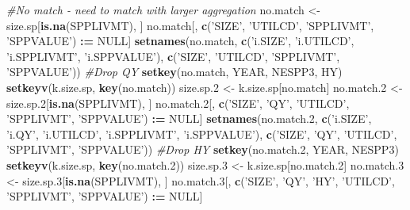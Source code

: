 \documentclass[]{article}
\newenvironment{Shaded}{\begin{snugshade}}{\end{snugshade}}
\newcommand{\KeywordTok}[1]{\textcolor[rgb]{0.13,0.29,0.53}{\textbf{#1}}}
\newcommand{\DecValTok}[1]{\textcolor[rgb]{0.00,0.00,0.81}{#1}}
\newcommand{\StringTok}[1]{\textcolor[rgb]{0.31,0.60,0.02}{#1}}
\newcommand{\CommentTok}[1]{\textcolor[rgb]{0.56,0.35,0.01}{\textit{#1}}}
\newcommand{\OtherTok}[1]{\textcolor[rgb]{0.56,0.35,0.01}{#1}}
\newcommand{\OperatorTok}[1]{\textcolor[rgb]{0.81,0.36,0.00}{\textbf{#1}}}
\newcommand{\ErrorTok}[1]{\textcolor[rgb]{0.64,0.00,0.00}{\textbf{#1}}}
\newcommand{\NormalTok}[1]{#1}
\begin{document}
\begin{Shaded}
\begin{Highlighting}[]
  \CommentTok{#No match - need to match with larger aggregation}
\NormalTok{  no.match  <-}\StringTok{ }\NormalTok{size.sp[}\KeywordTok{is.na}\NormalTok{(SPPLIVMT), ]}
\NormalTok{  no.match[, }\KeywordTok{c}\NormalTok{(}\StringTok{'SIZE'}\NormalTok{, }\StringTok{'UTILCD'}\NormalTok{, }\StringTok{'SPPLIVMT'}\NormalTok{, }\StringTok{'SPPVALUE'}\NormalTok{) }\OperatorTok{:}\ErrorTok{=}\StringTok{ }\OtherTok{NULL}\NormalTok{]}
  \KeywordTok{setnames}\NormalTok{(no.match, }\KeywordTok{c}\NormalTok{(}\StringTok{'i.SIZE'}\NormalTok{, }\StringTok{'i.UTILCD'}\NormalTok{, }\StringTok{'i.SPPLIVMT'}\NormalTok{, }\StringTok{'i.SPPVALUE'}\NormalTok{), }
           \KeywordTok{c}\NormalTok{(}\StringTok{'SIZE'}\NormalTok{, }\StringTok{'UTILCD'}\NormalTok{, }\StringTok{'SPPLIVMT'}\NormalTok{, }\StringTok{'SPPVALUE'}\NormalTok{))}
  \CommentTok{#Drop QY}
  \KeywordTok{setkey}\NormalTok{(no.match, YEAR, NESPP3, HY)}
  \KeywordTok{setkeyv}\NormalTok{(k.size.sp, }\KeywordTok{key}\NormalTok{(no.match))}
\NormalTok{  size.sp.}\DecValTok{2}\NormalTok{ <-}\StringTok{ }\NormalTok{k.size.sp[no.match]}
\NormalTok{  no.match.}\DecValTok{2}\NormalTok{ <-}\StringTok{ }\NormalTok{size.sp.}\DecValTok{2}\NormalTok{[}\KeywordTok{is.na}\NormalTok{(SPPLIVMT), ]}
\NormalTok{  no.match.}\DecValTok{2}\NormalTok{[, }\KeywordTok{c}\NormalTok{(}\StringTok{'SIZE'}\NormalTok{, }\StringTok{'QY'}\NormalTok{, }\StringTok{'UTILCD'}\NormalTok{, }\StringTok{'SPPLIVMT'}\NormalTok{, }\StringTok{'SPPVALUE'}\NormalTok{) }\OperatorTok{:}\ErrorTok{=}\StringTok{ }\OtherTok{NULL}\NormalTok{]}
  \KeywordTok{setnames}\NormalTok{(no.match.}\DecValTok{2}\NormalTok{, }\KeywordTok{c}\NormalTok{(}\StringTok{'i.SIZE'}\NormalTok{, }\StringTok{'i.QY'}\NormalTok{, }\StringTok{'i.UTILCD'}\NormalTok{, }\StringTok{'i.SPPLIVMT'}\NormalTok{, }\StringTok{'i.SPPVALUE'}\NormalTok{), }
           \KeywordTok{c}\NormalTok{(}\StringTok{'SIZE'}\NormalTok{, }\StringTok{'QY'}\NormalTok{, }\StringTok{'UTILCD'}\NormalTok{, }\StringTok{'SPPLIVMT'}\NormalTok{, }\StringTok{'SPPVALUE'}\NormalTok{))}
  \CommentTok{#Drop HY}
  \KeywordTok{setkey}\NormalTok{(no.match.}\DecValTok{2}\NormalTok{, YEAR, NESPP3)}
  \KeywordTok{setkeyv}\NormalTok{(k.size.sp, }\KeywordTok{key}\NormalTok{(no.match.}\DecValTok{2}\NormalTok{))}
\NormalTok{  size.sp.}\DecValTok{3}\NormalTok{ <-}\StringTok{ }\NormalTok{k.size.sp[no.match.}\DecValTok{2}\NormalTok{]}
\NormalTok{  no.match.}\DecValTok{3}\NormalTok{ <-}\StringTok{ }\NormalTok{size.sp.}\DecValTok{3}\NormalTok{[}\KeywordTok{is.na}\NormalTok{(SPPLIVMT), ]}
\NormalTok{  no.match.}\DecValTok{3}\NormalTok{[, }\KeywordTok{c}\NormalTok{(}\StringTok{'SIZE'}\NormalTok{, }\StringTok{'QY'}\NormalTok{, }\StringTok{'HY'}\NormalTok{, }\StringTok{'UTILCD'}\NormalTok{, }\StringTok{'SPPLIVMT'}\NormalTok{, }\StringTok{'SPPVALUE'}\NormalTok{) }\OperatorTok{:}\ErrorTok{=}\StringTok{ }\OtherTok{NULL}\NormalTok{]}

\end{Highlighting}
\end{Shaded}
\end{document}
